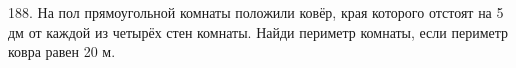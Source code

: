 188. На пол прямоугольной комнаты положили ковёр, края которого отстоят на  5 дм от каждой из четырёх стен комнаты. Найди периметр комнаты, если периметр ковра равен 20 м.\\
